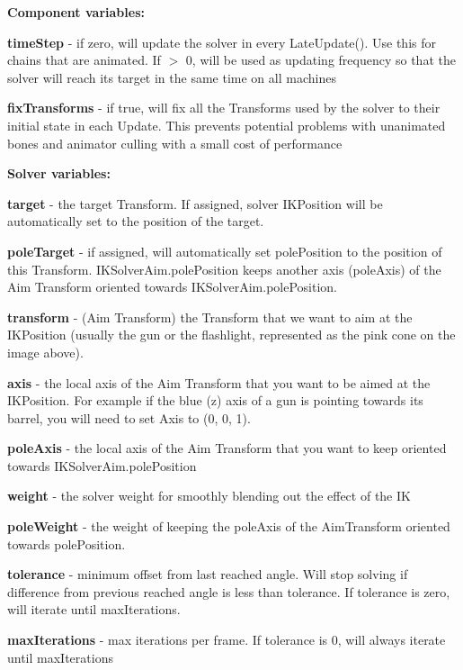 {\bfseries Component variables\+:}
\begin{DoxyItemize}
\item {\bfseries time\+Step} -\/ if zero, will update the solver in every Late\+Update(). Use this for chains that are animated. If $>$ 0, will be used as updating frequency so that the solver will reach its target in the same time on all machines
\item {\bfseries fix\+Transforms} -\/ if true, will fix all the Transforms used by the solver to their initial state in each Update. This prevents potential problems with unanimated bones and animator culling with a small cost of performance
\end{DoxyItemize}

{\bfseries Solver variables\+:}
\begin{DoxyItemize}
\item {\bfseries target} -\/ the target Transform. If assigned, solver I\+K\+Position will be automatically set to the position of the target.
\item {\bfseries pole\+Target} -\/ if assigned, will automatically set pole\+Position to the position of this Transform. I\+K\+Solver\+Aim.\+pole\+Position keeps another axis (pole\+Axis) of the Aim Transform oriented towards I\+K\+Solver\+Aim.\+pole\+Position.
\item {\bfseries transform} -\/ (Aim Transform) the Transform that we want to aim at the I\+K\+Position (usually the gun or the flashlight, represented as the pink cone on the image above).
\item {\bfseries axis} -\/ the local axis of the Aim Transform that you want to be aimed at the I\+K\+Position. For example if the blue (z) axis of a gun is pointing towards it\textquotesingle{}s barrel, you will need to set Axis to (0, 0, 1).
\item {\bfseries pole\+Axis} -\/ the local axis of the Aim Transform that you want to keep oriented towards I\+K\+Solver\+Aim.\+pole\+Position
\item {\bfseries weight} -\/ the solver weight for smoothly blending out the effect of the IK
\item {\bfseries pole\+Weight} -\/ the weight of keeping the pole\+Axis of the Aim\+Transform oriented towards pole\+Position.
\item {\bfseries tolerance} -\/ minimum offset from last reached angle. Will stop solving if difference from previous reached angle is less than tolerance. If tolerance is zero, will iterate until max\+Iterations.
\item {\bfseries max\+Iterations} -\/ max iterations per frame. If tolerance is 0, will always iterate until max\+Iterations

\end{DoxyItemize}
